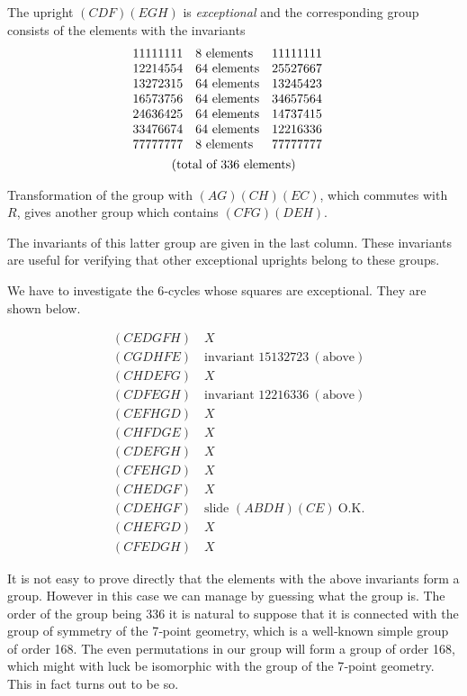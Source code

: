 \documentclass[12pt]{article}
\begin{document}
\medskip

The upright $(CDF)(EGH)$ is {\em exceptional} and the corresponding group consists of the elements with the invariants
\[
\begin{array}{llcl}
11111111 & 8\ \text{elements} & 11111111 &  \\
12214554 & 64\ \text{elements} & 25527667 &  \\
13272315 & 64\ \text{elements} & 13245423 &  \\
16573756 & 64\ \text{elements} & 34657564 &  \\
24636425 & 64\ \text{elements} & 14737415 &  \\
33476674 & 64\ \text{elements} & 12216336 &  \\
77777777 & 8\ \text{elements} & 77777777 &  \\[4pt]
\multicolumn{4}{c}{\text{(total of 336 elements)}} 
\end{array}
\]

Transformation of the group with $(AG)(CH)(EC)$, which commutes with $R$, gives another group which contains $(CFG)(DEH)$.

The invariants of this latter group are given in the last column. These invariants are useful for verifying that other exceptional uprights belong to these groups.

\medskip

We have to investigate the 6‐cycles whose squares are exceptional. They are shown below.

\[
\begin{aligned}
&(CEDGFH)\quad X\\
&(CGDHFE)\quad \text{invariant }15132723\ (\text{above})\\
&(CHDEFG)\quad X\\
&(CDFEGH)\quad \text{invariant }12216336\ (\text{above})\\
&(CEFHGD)\quad X\\
&(CHFDGE)\quad X\\
&(CDEFGH)\quad X\\
&(CFEHGD)\quad X\\
&(CHEDGF)\quad X\\
&(CDEHGF)\quad \text{slide }(ABDH)(CE)\ \text{O.K.}\\
&(CHEFGD)\quad X\\
&(CFEDGH)\quad X
\end{aligned}
\]

It is not easy to prove directly that the elements with the above invariants form a group. However in this case we can manage by guessing what the group is. The order of the group being 336 it is natural to suppose that it is connected with the group of symmetry of the 7‐point geometry, which is a well‐known simple group of order 168. The even permutations in our group will form a group of order 168, which might with luck be isomorphic with the group of the 7‐point geometry. This in fact turns out to be so.
\end{document}
